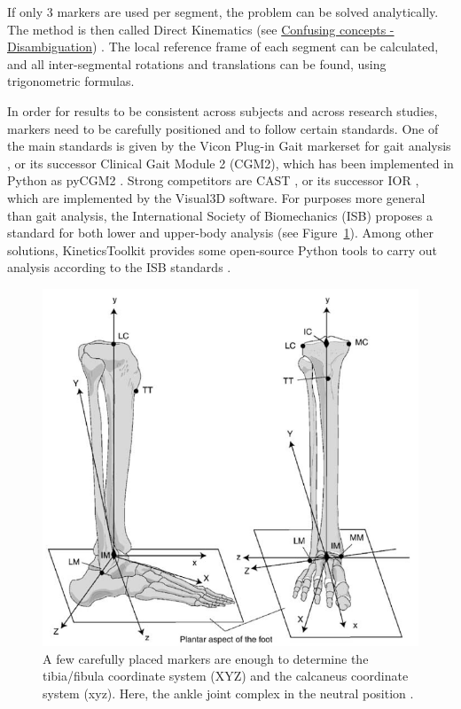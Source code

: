 If only 3 markers are used per segment, the problem can be solved analytically. The method is then called Direct Kinematics (see \hyperlink{Ann:gloss}{Confusing concepts - Disambiguation}) \cite{Lu1999}. The local reference frame of each segment can be calculated, and all inter-segmental rotations and translations can be found, using trigonometric formulas. 

In order for results to be consistent across subjects and across research studies, markers need to be carefully positioned and to follow certain standards. One of the main standards is given by the Vicon Plug-in Gait markerset for gait analysis \cite{Davis1991}, or its successor Clinical Gait Module 2 (CGM2), which has been implemented in Python as pyCGM2 \cite{Leboeuf2019b}. Strong competitors are CAST \cite{Cappozzo1995}, or its successor IOR \cite{Leardini2007}, which are implemented by the Visual3D software. For purposes more general than gait analysis, the International Society of Biomechanics (ISB) proposes a standard for both lower and upper-body analysis \cite{Wu2002, Wu2005} (see Figure~\ref{fig_isb}). Among other solutions, KineticsToolkit provides some open-source Python tools to carry out analysis according to the ISB standards \cite{Chenier2021}. 

\newpage

\begin{figure}[!ht]
	\centering
	\def\svgwidth{1\columnwidth}
	\fontsize{10pt}{10pt}\selectfont
	\includegraphics[width=0.7\linewidth]{"../Chap2/Figures/ISBaxis.PNG"}
	\caption{A few carefully placed markers are enough to determine the tibia/fibula coordinate system (XYZ) and the calcaneus coordinate system (xyz). Here, the ankle joint complex in the neutral position \cite{Wu2002}.}
	\label{fig_isb}
\end{figure}


